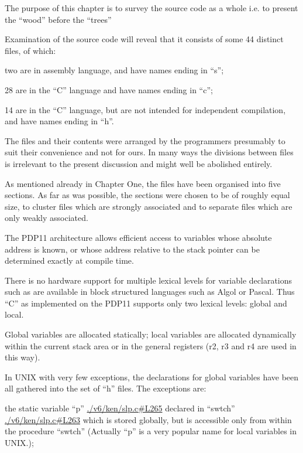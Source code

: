 %
%

The purpose of this chapter is to survey 
the source code as a whole i.e. to
present the ``wood'' before the ``trees''


Examination of the source code will
reveal that it consists of some 44 distinct 
files, of which:

\bi
\item two are in assembly language, and
have names ending in ``s'';

\item 28 are in the ``C'' language and
have names ending in ``c'';

\item 14 are in the ``C'' language, but
are not intended for independent
compilation, and have names ending
in ``h''.
\ei

The files and their contents were
arranged by the programmers presumably
to suit their convenience and not for
ours. In many ways the divisions
between files is irrelevant to the
present discussion and might well be
abolished entirely.

As mentioned already in Chapter One,
the files have been organised into five
sections. As far as was possible, the
sections were chosen to be of roughly
equal size, to cluster files which are
strongly associated and to separate
files which are only weakly associated.



The PDP11 architecture allows efficient
access to variables whose absolute
address is known, or whose address
relative to the stack pointer can be
determined exactly at compile time.


There is no hardware support for multiple 
lexical levels for variable
declarations such as are available in
block structured languages such as
Algol or Pascal. Thus ``C'' as implemented 
on the PDP11 supports only two
lexical levels: global and local.


Global variables are allocated statically;
local variables are allocated
dynamically within the current stack
area or in the general registers (r2,
r3 and r4 are used in this way).



In UNIX with very few exceptions, the
declarations for global variables have
been all gathered into the set of ``h''
files. The exceptions are:

\bd
\item[(a)] the static variable ``p'' \url{./v6/ken/slp.c#L265}
declared in ``swtch'' \url{./v6/ken/slp.c#L263} which is
stored globally, but is accessible 
only from within the procedure 
``swtch'' (Actually ``p'' is
a very popular name for local
variables in UNIX.);

